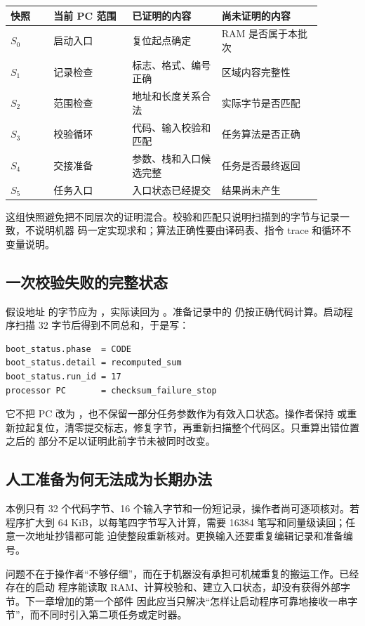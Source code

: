 \begin{longtable}{|L{0.12\linewidth}|L{0.22\linewidth}|L{0.25\linewidth}|L{0.29\linewidth}|}
\hline
{}
快照 & 当前 PC 范围 & 已证明的内容 & 尚未证明的内容 \\ \hline
\(S_0\) & 启动入口 & 复位起点确定 & RAM 是否属于本批次 \\ \hline
\(S_1\) & 记录检查 & 标志、格式、编号正确 & 区域内容完整性 \\ \hline
\(S_2\) & 范围检查 & 地址和长度关系合法 & 实际字节是否匹配 \\ \hline
\(S_3\) & 校验循环 & 代码、输入校验和匹配 & 任务算法是否正确 \\ \hline
\(S_4\) & 交接准备 & 参数、栈和入口候选完整 & 任务是否最终返回 \\ \hline
\(S_5\) & 任务入口 & 入口状态已经提交 & 结果尚未产生 \\ \hline
\end{longtable}

这组快照避免把不同层次的证明混合。校验和匹配只说明扫描到的字节与记录一致，不说明机器
码一定实现求和；算法正确性要由译码表、指令 trace 和循环不变量说明。

\subsection{一次校验失败的完整状态}

假设地址  的字节应为 ，实际读回为 。准备记录中的
 仍按正确代码计算。启动程序扫描 32 字节后得到不同总和，于是写：

\begin{lstlisting}
boot_status.phase  = CODE
boot_status.detail = recomputed_sum
boot_status.run_id = 17
processor PC       = checksum_failure_stop
\end{lstlisting}

它不把 PC 改为 ，也不保留一部分任务参数作为有效入口状态。操作者保持
或重新拉起复位，清零提交标志，修复字节，再重新扫描整个代码区。只重算出错位置之后的
部分不足以证明此前字节未被同时改变。

\subsection{人工准备为何无法成为长期办法}

本例只有 32 个代码字节、16 个输入字节和一份短记录，操作者尚可逐项核对。若程序扩大到
64 KiB，以每笔四字节写入计算，需要 16384 笔写和同量级读回；任意一次地址抄错都可能
迫使整段重新核对。更换输入还要重复编辑记录和准备编号。

问题不在于操作者“不够仔细”，而在于机器没有承担可机械重复的搬运工作。已经存在的启动
程序能读取 RAM、计算校验和、建立入口状态，却没有获得外部字节。下一章增加的第一个部件
因此应当只解决“怎样让启动程序可靠地接收一串字节”，而不同时引入第二项任务或定时器。
